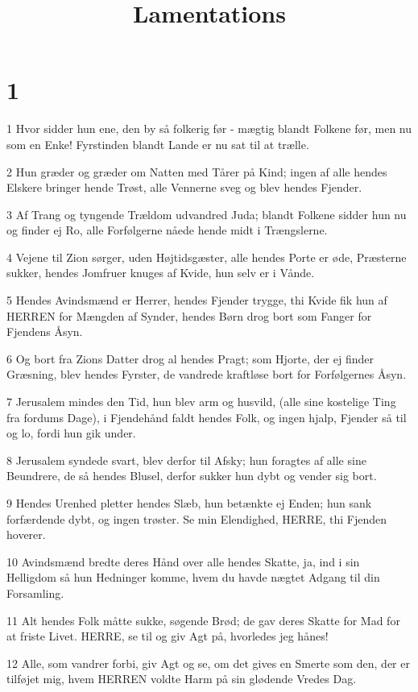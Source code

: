 

\title{Lamentations}


\chapter{1}

\par 1 Hvor sidder hun ene, den by så folkerig før - mægtig blandt Folkene før, men nu som en Enke! Fyrstinden blandt Lande er nu sat til at trælle.
\par 2 Hun græder og græder om Natten med Tårer på Kind; ingen af alle hendes Elskere bringer hende Trøst, alle Vennerne sveg og blev hendes Fjender.
\par 3 Af Trang og tyngende Trældom udvandred Juda; blandt Folkene sidder hun nu og finder ej Ro, alle Forfølgerne nåede hende midt i Trængslerne.
\par 4 Vejene til Zion sørger, uden Højtidsgæster, alle hendes Porte er øde, Præsterne sukker, hendes Jomfruer knuges af Kvide, hun selv er i Vånde.
\par 5 Hendes Avindsmænd er Herrer, hendes Fjender trygge, thi Kvide fik hun af HERREN for Mængden af Synder, hendes Børn drog bort som Fanger for Fjendens Åsyn.
\par 6 Og bort fra Zions Datter drog al hendes Pragt; som Hjorte, der ej finder Græsning, blev hendes Fyrster, de vandrede kraftløse bort for Forfølgernes Åsyn.
\par 7 Jerusalem mindes den Tid, hun blev arm og husvild, (alle sine kostelige Ting fra fordums Dage), i Fjendehånd faldt hendes Folk, og ingen hjalp, Fjender så til og lo, fordi hun gik under.
\par 8 Jerusalem syndede svart, blev derfor til Afsky; hun foragtes af alle sine Beundrere, de så hendes Blusel, derfor sukker hun dybt og vender sig bort.
\par 9 Hendes Urenhed pletter hendes Slæb, hun betænkte ej Enden; hun sank forfærdende dybt, og ingen trøster. Se min Elendighed, HERRE, thi Fjenden hoverer.
\par 10 Avindsmænd bredte deres Hånd over alle hendes Skatte, ja, ind i sin Helligdom så hun Hedninger komme, hvem du havde nægtet Adgang til din Forsamling.
\par 11 Alt hendes Folk måtte sukke, søgende Brød; de gav deres Skatte for Mad for at friste Livet. HERRE, se til og giv Agt på, hvorledes jeg hånes!
\par 12 Alle, som vandrer forbi, giv Agt og se, om det gives en Smerte som den, der er tilføjet mig, hvem HERREN voldte Harm på sin glødende Vredes Dag.
